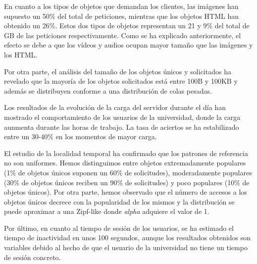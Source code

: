 \documentclass[twocolumn]{Jornadas}
\begin{document}
En cuanto a los tipos de objetos que demandan los clientes, las imágenes han supuesto un 50\% del total de peticiones, mientras que los objetos HTML han obtenido un 26\%. Estos dos tipos de objetos representan un 21 y 9\% del total de GB de las peticiones respectivamente. Como se ha explicado anteriormente, el efecto se debe a que los vídeos y audios ocupan mayor tamaño que las imágenes y los HTML.

Por otra parte, el análisis del tamaño de los objetos únicos y solicitados  ha revelado que la mayoría de los objetos solicitados está entre 100B y 100KB y además se distribuyen conforme a una distribución de colas pesadas.

Los resultados de la evolución de la carga del servidor durante el día han mostrado el comportamiento de los usuarios de la universidad, donde la carga aunmenta durante las horas de trabajo. La tasa de aciertos se ha estabilizado entre un 30-40\% en los momentos de mayor carga.

El estudio de la localidad temporal ha confirmado que los patrones de referencia no son uniformes. Hemos distinguimos entre objetos extremadamente populares (1\% de objetos únicos suponen un 60\% de solicitudes), moderadamente populares (30\% de objetos únicos reciben un 90\% de solicitudes) y poco populares (10\% de objetos únicos). Por otra parte, hemos observado que el número de accesos a los objetos únicos decrece con la popularidad de los mismos y la distribución se puede aproximar a una Zipf-like donde \emph{alpha} adquiere el valor de 1.

Por último, en cuanto al tiempo de sesión de los usuarios, se ha estimado el tiempo de inactividad en unos 100 segundos, aunque los resultados obtenidos son variables debido al hecho de que el usuario de la universidad no tiene un tiempo de sesión concreto.

\nocite{*}

\end{document}
